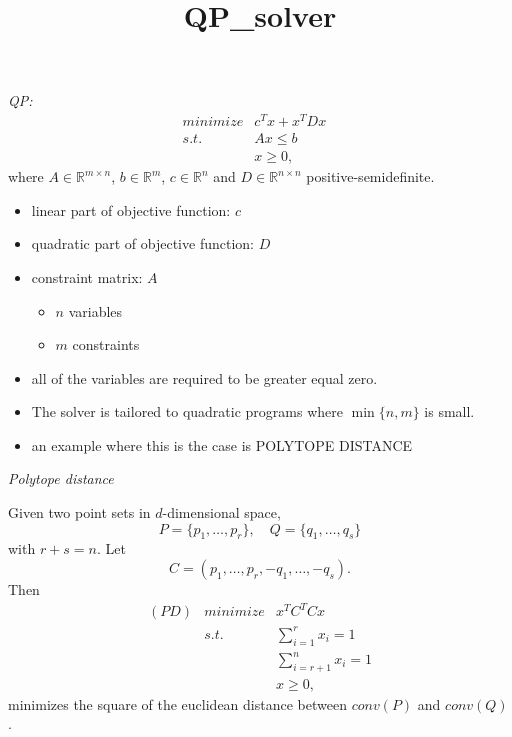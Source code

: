 \documentclass{slides}
\title{QP\_solver}
\author{}
\newcommand{\R}{\ensuremath{\mathbb{R}}}
\begin{document}
\maketitle
\begin{slide}
\emph{QP:}
\begin{eqnarray*}
minimize & c^{T}x+x^{T}Dx & \\
s.t.     & Ax \leq b & \\
         & x \geq 0 ,&
\end{eqnarray*}
where
$A \in \R^{m \times n}$, $b \in \R^{m}$, $c \in \R^{n}$ and $D \in \R^{n
\times n}$ positive-semidefinite.


\end{slide}

\begin{note}
\begin{itemize}
\item linear part of objective function: $c$
\item quadratic part of objective function: $D$
\item constraint matrix: $A$
\begin{itemize}
\item $n$ variables
\item $m$ constraints
\end{itemize}
\item all of the variables are required to be greater equal zero.
\item The solver is tailored to quadratic programs where
$\min\{n,m\}$ is small.
\item an example where this is the case is POLYTOPE DISTANCE
\end{itemize}
\end{note}

\begin{slide}
\emph{Polytope distance}

Given two point sets in $d$-dimensional space,
\[
P=\{p_{1}, \ldots, p_{r} \},
\quad
Q=\{q_{1}, \ldots, q_{s} \}
\]
with $r+s=n$. Let
\[
C=(p_{1}, \ldots , p_{r}, -q_{1}, \ldots, -q_{s}).
\]
Then 
\begin{eqnarray*}
(PD) & minimize & x^{T}C^{T}Cx  \\
     & s.t.     & \sum_{i=1}^{r}x_{i} = 1 \\
     &          & \sum_{i=r+1}^{n}x_{i} = 1 \\
     &          & x \geq 0,
\end{eqnarray*}
minimizes the square of the euclidean distance between $conv(P)$ and $conv(Q)$.
\end{slide}
\end{document}
